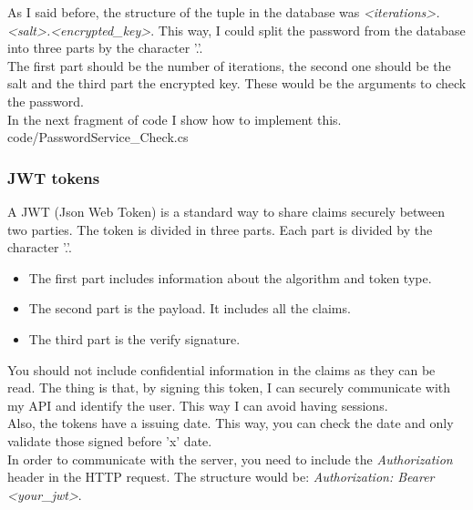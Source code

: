             As I said before, the structure of the tuple in the database was \textit{<iterations>.<salt>.<encrypted\_key>}. This way, I could split the password from the database into three parts by the character '.'. \\

            The first part should be the number of iterations, the second one should be the salt and the third part the encrypted key. These would be the arguments to check the password. \\

            In the next fragment of code I show how to implement this. \\

            
            {code/PasswordService_Check.cs}

        \subsubsection{JWT tokens}
            A JWT (Json Web Token) \cite{JWT.io} is a standard way to share claims securely between two parties. The token is divided in three parts. Each part is divided by the character '.'. \\
            \begin{itemize}[noitemsep]
                \item The first part includes information about the algorithm and token type.
                \item The second part is the payload. It includes all the claims.
                \item The third part is the verify signature.
            \end{itemize}

            You should not include confidential information in the claims as they can be read. The thing is that, by signing this token, I can securely communicate with my API and identify the user. This way I can avoid having sessions. \\
            Also, the tokens have a issuing date. This way, you can check the date and only validate those signed before 'x' date. \\

            In order to communicate with the server, you need to include the \textit{Authorization} header in the HTTP request. The structure would be: \textit{Authorization: Bearer <your\_jwt>}. \\

